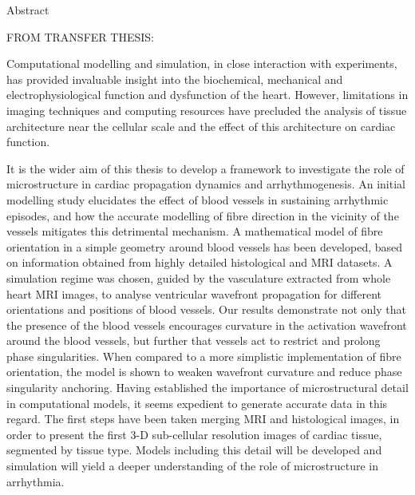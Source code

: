 {
\Large
\noindent\makebox[3in][l]{\xauthor}\hfill{} \vskip 1pt
\makebox[3in][l]{\xcollege}\hfill\makebox[3in][r]{\xterm}
}

\vskip 1cm

{
\LARGE \bf
\begin{center}
{\xtitle}
\end{center}
}

{
\large\bf
\begin{center}
Abstract
\end{center}
}

\setlength{\baselineskip}{16truept}
FROM TRANSFER THESIS:

Computational modelling and simulation, in close interaction with experiments, has provided invaluable insight into the biochemical, mechanical and electrophysiological function and dysfunction of the heart. However, limitations in imaging techniques and computing resources have precluded the analysis of tissue architecture near the cellular scale and the effect of this architecture on cardiac function.

It is the wider aim of this thesis to develop a framework to investigate the role of microstructure in cardiac propagation dynamics and arrhythmogenesis. An initial modelling study elucidates the effect of blood vessels in sustaining arrhythmic episodes, and how the accurate modelling of fibre direction in the vicinity of the vessels mitigates this detrimental mechanism. A mathematical model of fibre orientation in a simple geometry around blood vessels has been developed, based on information obtained from highly detailed histological and MRI datasets. A simulation regime was chosen, guided by the vasculature extracted from whole heart MRI images, to analyse ventricular wavefront propagation for different orientations and positions of blood vessels. Our results demonstrate not only that the presence of the blood vessels encourages curvature in the activation wavefront around the blood vessels, but further that vessels act to restrict and prolong phase singularities. When compared to a more simplistic implementation of fibre orientation, the model is shown to weaken wavefront curvature and reduce phase singularity anchoring. Having established the importance of microstructural detail in computational models, it seems expedient to generate accurate data in this regard. The first steps have been taken merging MRI and histological images, in order to present the first 3-D sub-cellular resolution images of cardiac tissue, segmented by tissue type. Models including this detail will be developed and simulation will yield a deeper understanding of the role of microstructure in arrhythmia.
